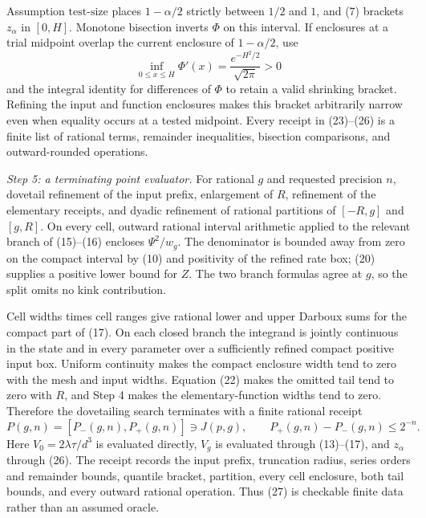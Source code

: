 Assumption \(\mathrm{test\mbox{-}size}\) places \(1-\alpha/2\) strictly between \(1/2\) and \(1\), and (7) brackets \(z_\alpha\) in \([0,H]\).  Monotone bisection inverts \(\Phi\) on this interval.  If enclosures at a trial midpoint overlap the current enclosure of \(1-\alpha/2\), use
\[
 \inf_{0\leq x\leq H}\Phi'(x)
 =\frac{e^{-H^2/2}}{\sqrt{2\pi}}>0
\tag{26}
\]
and the integral identity for differences of \(\Phi\) to retain a valid shrinking bracket.  Refining the input and function enclosures makes this bracket arbitrarily narrow even when equality occurs at a tested midpoint.  Every receipt in (23)--(26) is a finite list of rational terms, remainder inequalities, bisection comparisons, and outward-rounded operations.

\emph{Step 5: a terminating point evaluator.}
For rational \(g\) and requested precision \(n\), dovetail refinement of the input prefix, enlargement of \(R\), refinement of the elementary receipts, and dyadic refinement of rational partitions of \([-R,g]\) and \([g,R]\).  On every cell, outward rational interval arithmetic applied to the relevant branch of (15)--(16) encloses \(\Psi^2/w_g\).  The denominator is bounded away from zero on the compact interval by (10) and positivity of the refined rate box; (20) supplies a positive lower bound for \(Z\).  The two branch formulas agree at \(g\), so the split omits no kink contribution.

Cell widths times cell ranges give rational lower and upper Darboux sums for the compact part of (17).  On each closed branch the integrand is jointly continuous in the state and in every parameter over a sufficiently refined compact positive input box.  Uniform continuity makes the compact enclosure width tend to zero with the mesh and input widths.  Equation (22) makes the omitted tail tend to zero with \(R\), and Step 4 makes the elementary-function widths tend to zero.  Therefore the dovetailing search terminates with a finite rational receipt
\[
 P(g,n)=[P_-(g,n),P_+(g,n)]\ni J(p,g),
 \qquad P_+(g,n)-P_-(g,n)\leq2^{-n}.
\tag{27}
\]
Here \(V_0=2\lambda\tau/d^3\) is evaluated directly, \(V_g\) is evaluated through (13)--(17), and \(z_\alpha\) through (26).  The receipt records the input prefix, truncation radius, series orders and remainder bounds, quantile bracket, partition, every cell enclosure, both tail bounds, and every outward rational operation.  Thus (27) is checkable finite data rather than an assumed oracle.

